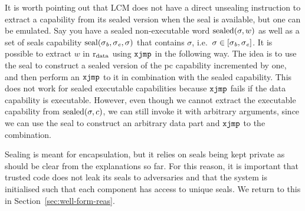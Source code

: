 \documentclass[acmsmall,screen]{acmart}\settopmatter{}
\newcommand{\trgcm}{\textsc{LCM}}
\renewcommand{\sectionname}{Section}
\newenvironment{jversion}%
    {\color{OliveGreen}}{}
\begin{document}
\begin{jversion}
  It is worth pointing out that \trgcm{} does not have a direct unsealing instruction to extract a capability from its sealed version when the seal is available, but one can be emulated.
  Say you have a sealed non-executable word $\mathrm{sealed}(\sigma,w)$ as well as a set of seals capability $\mathrm{seal}(\sigma_{\mathit{b}},\sigma_{\mathit{e}}, \sigma)$ that contains $\sigma$, i.e.\ $\sigma \in [\sigma_{\mathit{b}},\sigma_{\mathit{e}}]$.
  It is possible to extract $w$ in $\mathrm{r}_\mathrm{data}$ using $\txjmp{}{}$ in the following way.
  The idea is to use the seal to construct a sealed version of the pc capability incremented by one, and then perform an $\txjmp{}{}$ to it in combination with the sealed capability.
  This does not work for sealed executable capabilities because $\txjmp{}{}$ fails if the data capability is executable.
  However, even though we cannot extract the executable capability from $\mathrm{sealed}(\sigma,c)$, we can still invoke it with arbitrary arguments, since we can use the seal to construct an arbitrary data part and $\txjmp{}{}$ to the combination.

  Sealing is meant for encapsulation, but it relies on seals being kept private as should be clear from the explanations so far.
  For this reason, it is important that trusted code does not leak its seals to adversaries and that the system is initialised such that each component has access to unique seals.
  We return to this in \sectionname~\ref{sec:well-form-reas}.
\end{jversion}
\end{document}
